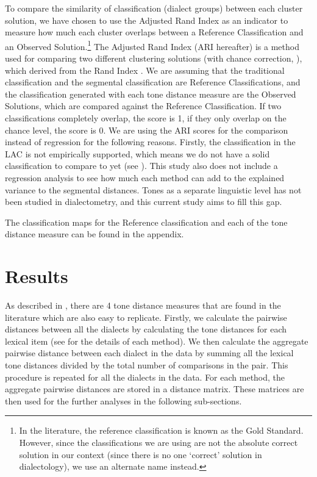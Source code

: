\documentclass[output=paper, chinesefont]{langscibook}
\begin{document}
To compare the similarity of classification (dialect groups) between each cluster solution, we have chosen to use the Adjusted Rand Index as an indicator to measure how much each cluster overlaps between a Reference Classification and an Observed Solution.\footnote{In the literature, the reference classification is known as the Gold Standard. However, since the classifications we are using are not the absolute correct solution in our context (since there is no one ‘correct’ solution in dialectology), we use an alternate name instead.} The Adjusted Rand Index (ARI hereafter) is a method used for comparing two different clustering solutions (with chance correction, \citealt{HubertArabie1985}), which derived from the Rand Index \citep{Rand1971}. We are assuming that the traditional classification and the segmental classification are Reference Classifications, and the classification generated with each tone distance measure are the Observed Solutions, which are compared against the Reference Classification. If two classifications completely overlap, the score is 1, if they only overlap on the chance level, the score is 0. We are using the ARI scores for the comparison instead of regression for the following reasons. Firstly, the classification in the LAC is not empirically supported, which means we do not have a solid classification to compare to yet (see ). This study also does not include a regression analysis to see how much each method can add to the explained variance to the segmental distances. Tones as a separate linguistic level has not been studied in dialectometry, and this current study aims to fill this gap.

The classification maps for the Reference classification and each of the tone distance measure can be found in the appendix.

\section{Results}
\label{sec:sung:5}
As described in , there are 4 tone distance measures that are found in the literature which are also easy to replicate. Firstly, we calculate the pairwise distances between all the dialects by calculating the tone distances for each lexical item (see  for the details of each method). We then calculate the aggregate pairwise distance between each dialect in the data by summing all the lexical tone distances divided by the total number of comparisons in the pair. This procedure is repeated for all the dialects in the data. For each method, the aggregate pairwise distances are stored in a distance matrix. These matrices are then used for the further analyses in the following sub-sections.
\end{document}
